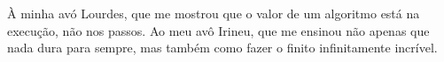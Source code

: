 À minha avó Lourdes, que me mostrou que o valor de um algoritmo está na execução, não nos passos.
\newline
Ao meu avô Irineu, que me ensinou não apenas que nada dura para sempre, mas também como fazer o finito infinitamente incrível.
